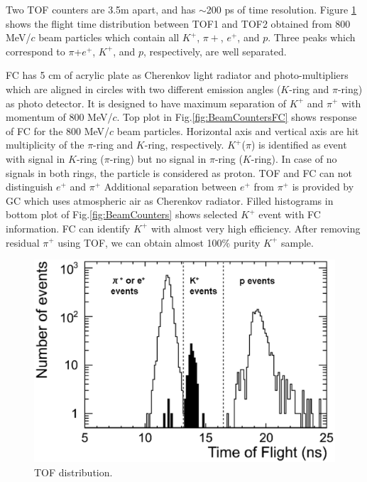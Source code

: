 Two TOF counters are 3.5m apart, and has $\sim$200 ps of time resolution.
Figure \ref{fig:BeamCountersTOF} shows the flight time distribution between TOF1 and TOF2
obtained from 800 MeV/$c$ beam particles which contain all $K^{+}$, $\pi{+}$, $e^{+}$, and $p$. 
Three peaks which correspond to $\pi$+$e^+$, $K^+$, and $p$, respectively, are well separated.

FC has 5 cm of acrylic plate as Cherenkov light radiator and 
photo-multipliers which are aligned in circles with two different emission angles
($K$-ring and $\pi$-ring) as photo detector.
It is designed to have maximum separation of $K^{+}$ and $\pi^{+}$ with momentum of 800 MeV/$c$.
Top plot in Fig.\ref{fig:BeamCountersFC} shows response of FC for the 800 MeV/$c$ beam particles. 
Horizontal axis and vertical axis are hit multiplicity of the $\pi$-ring and $K$-ring, respectively. 
$K^+$($\pi$) is identified as event with signal in $K$-ring ($\pi$-ring) but no signal in $\pi$-ring ($K$-ring).
In case of no signals in both rings, the particle is considered as proton.
TOF and FC can not distinguish $e^{+}$ and $\pi^+$
Additional separation between $e^{+}$ from $\pi^+$ is provided by GC which uses atmospheric air as
Cherenkov radiator. 
Filled histograms in bottom plot of Fig.\ref{fig:BeamCounters} shows selected $K^+$ event with FC information.
FC can identify $K^+$ with almost very high efficiency. After removing residual $\pi^+$ using TOF, we can obtain
almost 100\% purity $K^+$ sample.


\begin{figure}[htbp]
  \begin{center}
    \includegraphics[width=1.0\hsize,clip]{fig/TOF_cut.eps}
  \end{center}
 \caption{TOF distribution.}
 \label{fig:BeamCountersTOF}
\end{figure}

